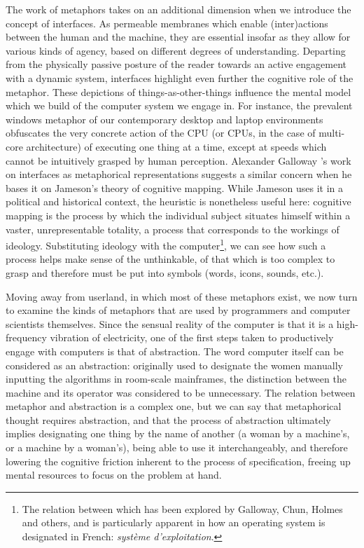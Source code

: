 \documentclass{article}
\begin{document}
The work of metaphors takes on an additional dimension when we introduce the concept of interfaces. As permeable membranes which enable (inter)actions between the human and the machine, they are essential insofar as they allow for various kinds of agency, based on different degrees of understanding. Departing from the physically passive posture of the reader towards an active engagement with a dynamic system, interfaces highlight even further the cognitive role of the metaphor. These depictions of things-as-other-things influence the mental model which we build of the computer system we engage in. For instance, the prevalent windows metaphor of our contemporary desktop and laptop environments obfuscates the very concrete action of the CPU (or CPUs, in the case of multi-core architecture) of executing one thing at a time, except at speeds which cannot be intuitively grasped by human perception. Alexander Galloway 's work on interfaces as metaphorical representations suggests a similar concern when he bases it on Jameson's theory of cognitive mapping. While Jameson uses it in a political and historical context, the heuristic is nonetheless useful here: cognitive mapping is the process by which the individual subject situates himself within a vaster, unrepresentable totality, a process that corresponds to the workings of ideology. Substituting ideology with the computer\footnote{The relation between which has been explored by Galloway, Chun, Holmes and others, and is particularly apparent in how an operating system is designated in French: \emph{système d'exploitation}.}, we can see how such a process helps make sense of the unthinkable, of that which is too complex to grasp and therefore must be put into symbols (words, icons, sounds, etc.).

Moving away from userland, in which most of these metaphors exist, we now turn to examine the kinds of metaphors that are used by programmers and computer scientists themselves. Since the sensual reality of the computer is that it is a high-frequency vibration of electricity, one of the first steps taken to productively engage with computers is that of abstraction. The word computer itself can be considered as an abstraction: originally used to designate the women manually inputting the algorithms in room-scale mainframes, the distinction between the machine and its operator was considered to be unnecessary. The relation between metaphor and abstraction is a complex one, but we can say that metaphorical thought requires abstraction, and that the process of abstraction ultimately implies designating one thing by the name of another (a woman by a machine's, or a machine by a woman's), being able to use it interchangeably, and therefore lowering the cognitive friction inherent to the process of specification, freeing up mental resources to focus on the problem at hand.
\end{document}
